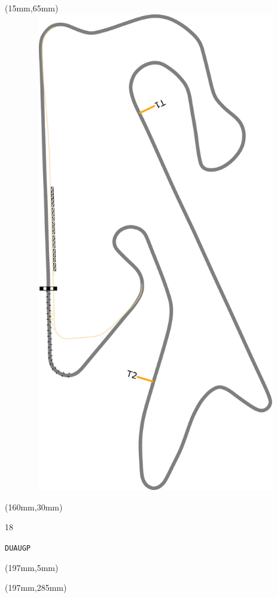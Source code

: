 \begin{textblock*}{185mm}(15mm,65mm)%
\centering
\mbox{\includegraphics[width=185mm,height=210mm,keepaspectratio]{PT/DUAUGP.pdf}}
\end{textblock*}
\begin{textblock*}{40mm}(160mm,30mm)%
\Large
\par{} 
\par18 
\par\hfill\tiny\tt DUAUGP\\
\end{textblock*}
\begin{textblock*}{20mm}(197mm,5mm)%
\fbox{\thepage}
\label{DUAUGP}
\end{textblock*}
\begin{textblock*}{20mm}(197mm,285mm)%
\fbox{\thepage}
\end{textblock*}

